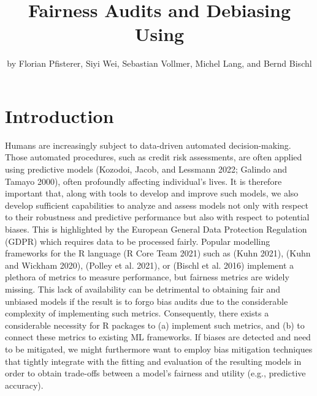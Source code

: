 \title{Fairness Audits and Debiasing Using }
\author{by Florian Pfisterer, Siyi Wei, Sebastian Vollmer, Michel Lang, and Bernd Bischl}

\maketitle


\hypertarget{introduction}{%
\section{Introduction}\label{introduction}}

Humans are increasingly subject to data-driven automated decision-making.
Those automated procedures, such as credit risk assessments, are often applied using predictive models (Kozodoi, Jacob, and Lessmann 2022; Galindo and Tamayo 2000), often profoundly affecting individual's lives.
It is therefore important that, along with tools to develop and improve such models, we also develop sufficient capabilities to analyze and assess models not only with respect to their robustness and predictive performance but also with respect to potential biases.
This is highlighted by the European General Data Protection Regulation (GDPR) which requires data to be processed fairly.
Popular modelling frameworks for the R language (R Core Team 2021) such as  (Kuhn 2021),  (Kuhn and Wickham 2020),  (Polley et al. 2021), or  (Bischl et al. 2016) implement a plethora of metrics to measure performance, but fairness metrics are widely missing.
This lack of availability can be detrimental to obtaining fair and unbiased models if the result is to forgo bias audits due to the considerable complexity of implementing such metrics.
Consequently, there exists a considerable necessity for R packages to (a) implement such metrics, and (b) to connect these metrics to existing ML frameworks.
If biases are detected and need to be mitigated, we might furthermore want to employ bias mitigation techniques that tightly integrate with the fitting and evaluation of the resulting models in order to obtain trade-offs between a model's fairness and utility (e.g., predictive accuracy).

